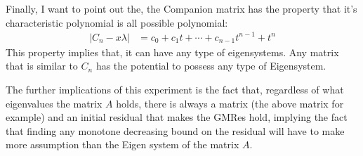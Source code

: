 \documentclass[]{article}
\begin{document}
        \par
        Finally, I want to point out the, the Companion matrix has the property that it's characteristic polynomial is all possible polynomial: 
        \begin{align*}\tag{4.b.4}\label{eqn:4.b.4}
            |C_n - x\lambda |&= 
            c_0 + c_1t + \cdots + c_{n - 1}t^{n - 1} + t^n
        \end{align*}
        This property implies that, it can have any type of eigensystems. Any matrix that is similar to $C_n$ has the potential to possess any type of Eigensystem. 
        \par
        The further implications of this experiment is the fact that, regardless of what eigenvalues the matrix $A$ holds, there is always a matrix (the above matrix for example) and an initial residual that makes the GMRes hold, implying the fact that finding any monotone decreasing bound on the residual will have to make more assumption than the Eigen system of the matrix $A$. 
\end{document}

